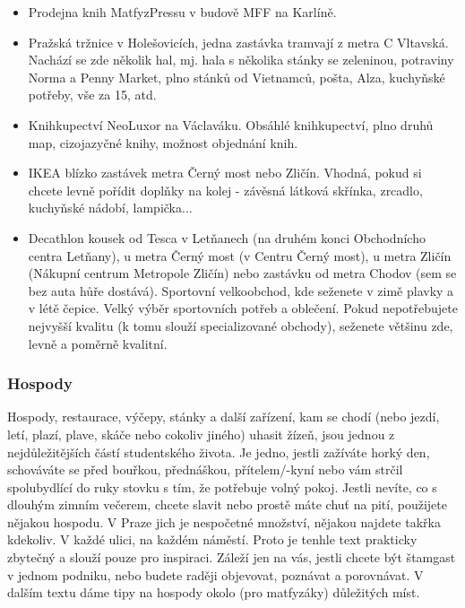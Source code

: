\begin{itemize}
    \item Prodejna knih MatfyzPressu v budově MFF na Karlíně.
    \item Pražská tržnice v Holešovicích, jedna zastávka tramvají z metra C Vltavská. Nachází se zde několik hal, mj. hala s několika stánky se zeleninou, potraviny Norma a Penny Market, plno stánků od Vietnamců, pošta, Alza, kuchyňské potřeby, vše za 15, atd.
    \item Knihkupectví NeoLuxor na Václaváku. Obsáhlé knihkupectví, plno druhů map, cizojazyčné knihy, možnost objednání knih.
    \item IKEA blízko zastávek metra Černý most nebo Zličín. Vhodná, pokud si chcete levně pořídit doplňky na kolej - závěsná látková skřínka, zrcadlo, kuchyňské nádobí, lampička...
    \item Decathlon kousek od Tesca v Letňanech (na druhém konci Obchodnícho centra Letňany), u metra Černý most (v Centru Černý most), u metra Zličín (Nákupní centrum Metropole Zličín) nebo zastávku od metra Chodov (sem se bez auta hůře dostává). Sportovní velkoobchod, kde seženete v zimě plavky a v létě čepice. Velký výběr sportovních potřeb a oblečení. Pokud nepotřebujete nejvyšší kvalitu (k tomu slouží specializované obchody), seženete většinu zde, levně a poměrně kvalitní.
\end{itemize}



\subsubsection{Hospody}
Hospody, restaurace, výčepy, stánky a další zařízení, kam se chodí (nebo jezdí, letí, plazí, plave, skáče nebo cokoliv jiného) uhasit žízeň, jsou jednou z nejdůležitějších částí studentského života. Je jedno, jestli zažíváte horký den, schováváte se před bouřkou, přednáškou, přítelem/-kyní nebo vám strčil spolubydlící do ruky stovku s tím, že potřebuje volný pokoj. Jestli nevíte, co s dlouhým zimním večerem, chcete slavit nebo prostě máte chuť na pití, použijete nějakou hospodu. V Praze jich je nespočetné množství, nějakou najdete takřka kdekoliv. V každé ulici, na každém náměstí. Proto je tenhle text prakticky zbytečný a slouží pouze pro inspiraci. Záleží jen na vás, jestli chcete být štamgast v jednom podniku, nebo budete raději objevovat, poznávat a porovnávat. V dalším textu dáme tipy na hospody okolo (pro matfyzáky) důležitých míst.

